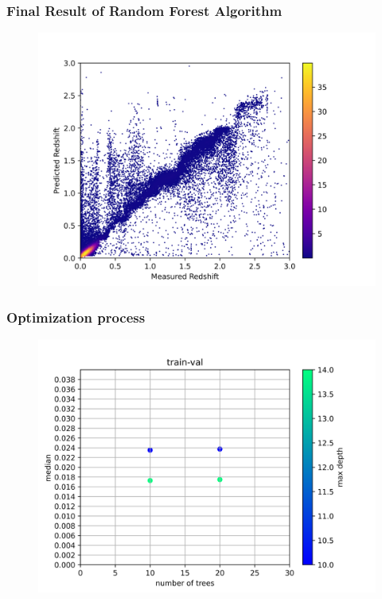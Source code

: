 \documentclass{beamer}
\begin{document}
\begin{frame}
	\frametitle{Final Result of Random Forest Algorithm}
    \begin{figure}
        \includegraphics[scale=0.6]{img/Forest_Result.png}
    \end{figure}
    \end{frame}

\begin{frame}
	\frametitle{Optimization process}
    \begin{figure}
        \includegraphics[scale=0.60]{img/train-val.png}
    \end{figure}
    \end{frame}
\end{document}
